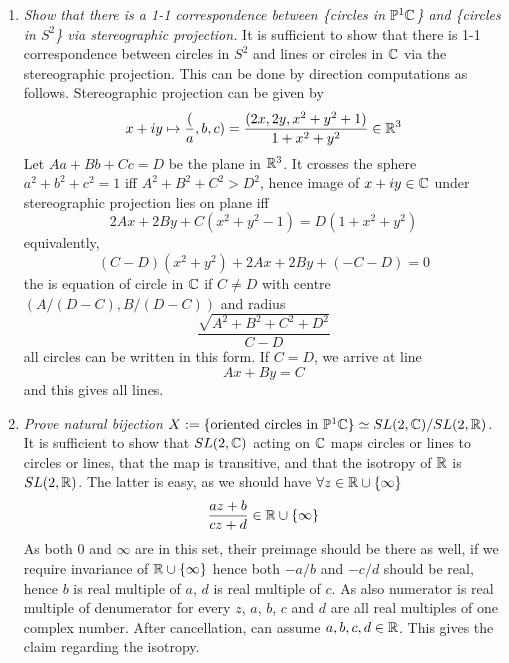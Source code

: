 \documentclass[10pt]{article} %
\begin{document}
\begin{enumerate}[1. ]
\item\textit{Show that there is a 1-1 correspondence between \{circles in $\mathbb{P}^1\mathbb{C}$\} and \{circles in $S^2$\} via stereographic
projection.}
It is sufficient to show that there is 1-1 correspondence between circles in $S^2$ and lines or circles in $\mathbb{C}$ via the stereographic projection.
This can be done by direction computations as follows. Stereographic projection can be given by
\[x+iy\mapsto\frac(a,b,c)=\frac{(2x,2y,x^2+y^2+1)}{1+x^2+y^2}\in\mathbb{R}^3\]
Let $Aa+Bb+Cc=D$ be the plane in $\mathbb{R}^3$. It crosses the sphere $a^2+b^2+c^2=1$ iff $A^2+B^2+C^2>D^2$, hence
image of $x+iy\in\mathbb{C}$ under stereographic projection lies on plane iff
\[2Ax+2By+C(x^2+y^2-1)=D(1+x^2+y^2)\]
equivalently,
\[(C-D)(x^2+y^2)+2Ax+2By+(-C-D)=0\]
the is equation of circle in $\mathbb{C}$ if $C\neq D$ with centre $(A/(D-C),B/(D-C))$ and radius
\[\frac{\sqrt{A^2+B^2+C^2+D^2}}{C-D}\]
all circles can be written in this form. If $C=D$, we arrive at line
\[Ax+By=C\]
and this gives all lines.
\item\textit{Prove natural bijection $X:=\{\mbox{oriented circles in $\mathbb{P}^1\mathbb{C}$}\}\simeq SL(2,\mathbb{C})/SL(2,\mathbb{R})$.}%
It is sufficient to show that $SL(2,\mathbb{C})$ acting on $\mathbb{C}$ maps circles or lines to circles or lines, that the map is transitive, and
that the isotropy of $\mathbb{R}$ is $SL(2,\mathbb{R})$.
The latter is easy, as we should have $\forall z\in\mathbb{R}\cup\left\{\infty\right\}$
\[\frac{az+b}{cz+d}\in\mathbb{R}\cup\left\{\infty\right\}\]
As both $0$ and $\infty$ are in this set, their preimage should be there as well, if we require invariance of $\mathbb{R}\cup\left\{\infty\right\}$
hence both $-a/b$ and $-c/d$ should be real, hence $b$ is real multiple of $a$, $d$ is real multiple of $c$. As also numerator
is real multiple of denumerator for every $z$, $a$, $b$, $c$ and $d$ are all real multiples of one complex number. After cancellation, can assume
$a,b,c,d\in\mathbb{R}$. This gives the claim regarding the isotropy.%


\end{enumerate}
\end{document}
